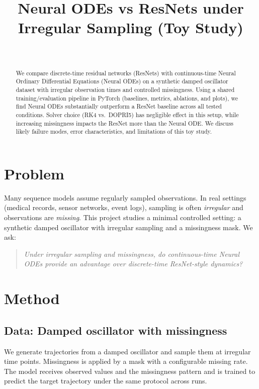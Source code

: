 ﻿\documentclass[10pt]{article}
\title{\textbf{Neural ODEs vs ResNets under Irregular Sampling (Toy Study)}}
\author{\AuthorName \\
\small \href{\GithubURL}{\GithubURL}}
\date{}
\begin{document}
\maketitle

\begin{abstract}
We compare discrete-time residual networks (ResNets) with continuous-time Neural Ordinary Differential Equations (Neural ODEs) on a synthetic damped oscillator dataset with irregular observation times and controlled missingness. Using a shared training/evaluation pipeline in PyTorch (baselines, metrics, ablations, and plots), we find Neural ODEs substantially outperform a ResNet baseline across all tested conditions. Solver choice (RK4 vs.\ DOPRI5) has negligible effect in this setup, while increasing missingness impacts the ResNet more than the Neural ODE. We discuss likely failure modes, error characteristics, and limitations of this toy study.
\end{abstract}

\vspace{-0.5em}
\section{Problem}
Many sequence models assume regularly sampled observations. In real settings (medical records, sensor networks, event logs), sampling is often \emph{irregular} and observations are \emph{missing}. This project studies a minimal controlled setting: a synthetic damped oscillator with irregular sampling and a missingness mask. We ask:
\begin{quote}
\emph{Under irregular sampling and missingness, do continuous-time Neural ODEs provide an advantage over discrete-time ResNet-style dynamics?}
\end{quote}

\section{Method}
\subsection{Data: Damped oscillator with missingness}
We generate trajectories from a damped oscillator and sample them at irregular time points. Missingness is applied by a mask with a configurable missing rate. The model receives observed values and the missingness pattern and is trained to predict the target trajectory under the same protocol across runs.
\end{document}
